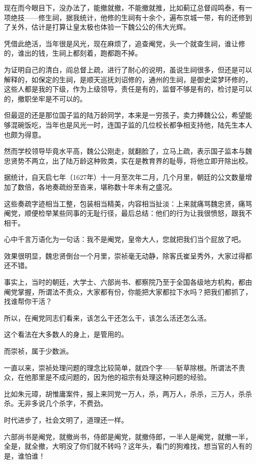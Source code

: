 \begin{multicols}{\theparacolNo}
现在而今眼目下，没办法了，能撤就撤，不能撤就推，比如蓟辽总督阎鸣泰，有一项绝技——修生祠，据我统计，他修的生祠有十余个，遍布京城一带，有的还修到了关外，估计是打算让皇太极也体验一下魏公公的伟大光辉。

凭借此绝活，当年很是风光，现在麻烦了，追查阉党，头一个就查生祠，谁让修的，谁出的钱，生祠上都刻着，跑都跑不掉。

为证明自己的清白，阎总督上疏，进行了耐心的说明，虽说生祠很多，但还是可以解释的，如保定的生祠，是顺天巡抚刘诏修的，通州的生祠，是御史梁梦环修的，这些人都是我的下级，作为上级领导，责任是有的，监督不够是有的，检讨是可以的，撤职坐牢是不可以的。

但最逗的还是那位国子监的陆万龄同学，本来是一穷孩子，卖力捧魏公公，希望能够混碗饭吃，当年也是风光一时，连国子监的几位校长都争相支持他，陆先生本人也颇为得意。

然而学校领导毕竟水平高，魏公公刚走，就翻脸了，立马上疏，表示国子监本与魏忠贤势不两立，出了陆万龄这种败类，实在是教育界的耻辱，将他立即开除出校。

据统计，自天启七年（1627年）十一月至次年二月，几个月里，朝廷的公文数量增加了数倍，各地奏疏纷至沓来，堪称数十年未有之盛况。

这些奏疏字迹相当工整，包装相当精美，内容相当扯淡：上来就痛骂魏忠贤，痛骂阉党，顺便检举某些同事的无耻行径，最后总结：他们的行为让我很愤怒，跟我不相干。

心中千言万语化为一句话：我不是阉党，皇帝大人，您就把我们当个屁放了吧。

效果很明显，魏忠贤倒台一个月里，崇祯毫无动静，除客氏崔呈秀外，大家过得都还不错。

事实上，当时的朝廷，大学士、六部尚书、都察院乃至于全国各级地方机构，都由阉党掌握，所谓法不责众，大家都有份，你能把大家都拉下水吗？把我们都抓了，找谁帮你干活？

所以，在阉党同志们看来，该怎么干还怎么干，该怎么活还怎么活。

这个看法在大多数人的身上，是管用的。

而崇祯，属于少数派。

一直以来，崇祯处理问题的理念比较简单，就四个字——斩草除根。所谓法不责众，在他那里是不成问题的，因为他的祖宗有处理这种问题的经验。

比如朱元璋，胡惟庸案件，报上来同党一万人，杀，两万人，杀杀，三万人，杀杀杀。无非多说几个杀字，不费劲。

时代进步了，社会文明了，道理还一样。

六部尚书是阉党，就撤尚书，侍郎是阉党，就撤侍郎，一半人是阉党，就撤一半，全是，就全撤，大明没了你们就不转吗？这年头，看门的狗难找，想当官的人有的是，谁怕谁！


\end{multicols}
